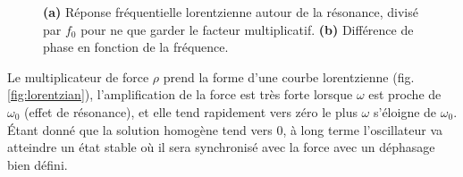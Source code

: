 \begin{figure}[!t]
    \caption{\textbf{(a)} Réponse fréquentielle lorentzienne autour de la résonance, divisé par $f_0$ pour ne que garder le facteur multiplicatif. \textbf{(b)} Différence de phase en fonction de la fréquence.}

\end{figure}
%
Le multiplicateur de force $\rho$ prend la forme d’une courbe lorentzienne (fig. \ref{fig:lorentzian}), l’amplification 
de la force est très forte lorsque $\omega$ est proche de $\omega_0$ 
(effet de résonance), et elle tend rapidement vers zéro 
le plus $\omega$ s’éloigne de $\omega_0$.
%
Étant donné que la solution homogène tend vers $0$, à long terme l'oscillateur va atteindre un état stable où il sera synchronisé avec la force
avec un déphasage bien défini.